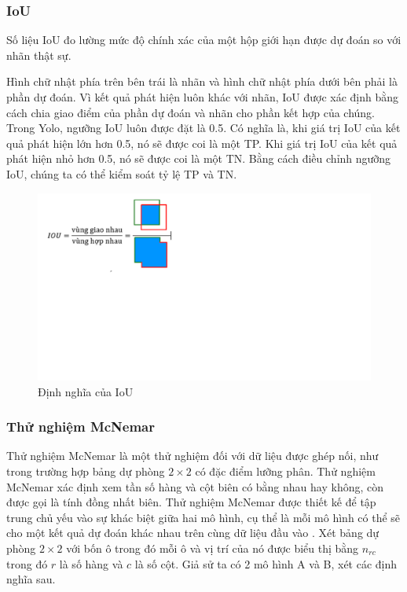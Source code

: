 \documentclass[../the.tex]{subfiles}
\begin{document}
\subsubsection*{IoU}

{\fontsize{13}{12} \selectfont
Số liệu IoU đo lường mức độ chính xác của một hộp giới hạn được dự đoán so với nhãn thật sự. 

Hình chữ nhật phía trên bên trái là nhãn và hình chữ nhật phía dưới bên phải là phần dự đoán. Vì kết quả phát hiện luôn khác với nhãn, IoU được xác định bằng cách chia giao điểm của phần dự đoán và nhãn cho phần kết hợp của chúng. Trong Yolo, ngưỡng IoU luôn được đặt là 0.5. Có nghĩa là, khi giá trị IoU của kết quả phát hiện lớn hơn 0.5, nó sẽ được coi là một TP. Khi giá trị IoU của kết quả phát hiện nhỏ hơn 0.5, nó sẽ được coi là một TN. Bằng cách điều chỉnh ngưỡng IoU, chúng ta có thể kiểm soát tỷ lệ TP và TN.
}

\begin{figure}[ht!]
\centering
	\includegraphics[width=1\textwidth]{images/IoU.PNG}
	\caption{Định nghĩa của IoU}
	\label{fig:IoU}
\end{figure}

\subsubsection*{Thử nghiệm McNemar}

Thử nghiệm McNemar \cite{McNemar1947} là một thử nghiệm đối với dữ liệu được ghép nối, như trong trường hợp bảng dự phòng $2 \times 2$ có đặc điểm lưỡng phân. Thử nghiệm McNemar xác định xem tần số hàng và cột biên có bằng nhau hay không, còn được gọi là tính đồng nhất biên. Thử nghiệm McNemar được thiết kế để tập trung chủ yếu vào sự khác biệt giữa hai mô hình, cụ thể là mỗi mô hình có thể sẽ cho một kết quả dự đoán khác nhau trên cùng dữ liệu đầu vào . Xét bảng dự phòng $2 \times 2$ với bốn ô trong đó mỗi ô và vị trí của nó được biểu thị bằng $n_{rc}$ trong đó $r$ là số hàng và $c$ là số cột. Giả sử ta có 2 mô hình A và B, xét các định nghĩa sau.
\end{document}
